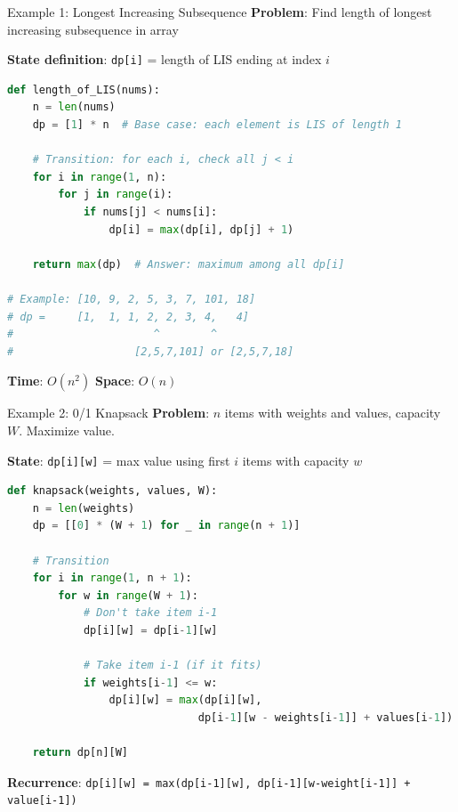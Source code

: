 \documentclass[aspectratio=169]{beamer}
\begin{document}
\begin{frame}[fragile]{Example 1: Longest Increasing Subsequence}
  \textbf{Problem}: Find length of longest increasing subsequence in array

  \vspace{0.3cm}

  \textbf{State definition}: \texttt{dp[i]} = length of LIS ending at index $i$

\begin{lstlisting}[language=Python, basicstyle=\ttfamily\tiny]
def length_of_LIS(nums):
    n = len(nums)
    dp = [1] * n  # Base case: each element is LIS of length 1

    # Transition: for each i, check all j < i
    for i in range(1, n):
        for j in range(i):
            if nums[j] < nums[i]:
                dp[i] = max(dp[i], dp[j] + 1)

    return max(dp)  # Answer: maximum among all dp[i]

# Example: [10, 9, 2, 5, 3, 7, 101, 18]
# dp =     [1,  1, 1, 2, 2, 3, 4,   4]
#                      ^        ^
#                   [2,5,7,101] or [2,5,7,18]
\end{lstlisting}

  \textbf{Time}: $O(n^2)$ \quad \textbf{Space}: $O(n)$
\end{frame}

\begin{frame}[fragile]{Example 2: 0/1 Knapsack}
  \textbf{Problem}: $n$ items with weights and values, capacity $W$. Maximize value.

  \vspace{0.3cm}

  \textbf{State}: \texttt{dp[i][w]} = max value using first $i$ items with capacity $w$

\begin{lstlisting}[language=Python, basicstyle=\ttfamily\tiny]
def knapsack(weights, values, W):
    n = len(weights)
    dp = [[0] * (W + 1) for _ in range(n + 1)]

    # Transition
    for i in range(1, n + 1):
        for w in range(W + 1):
            # Don't take item i-1
            dp[i][w] = dp[i-1][w]

            # Take item i-1 (if it fits)
            if weights[i-1] <= w:
                dp[i][w] = max(dp[i][w],
                              dp[i-1][w - weights[i-1]] + values[i-1])

    return dp[n][W]
\end{lstlisting}

  \textbf{Recurrence}: \texttt{dp[i][w] = max(dp[i-1][w], dp[i-1][w-weight[i-1]] + value[i-1])}
\end{frame}
\end{document}
